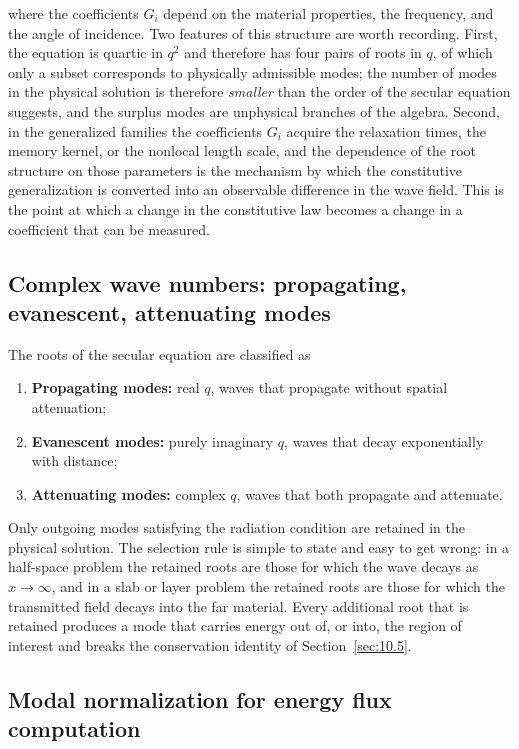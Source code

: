 where the coefficients $G_i$ depend on the material properties, the frequency, and the angle of incidence. Two features of this structure are worth recording. First, the equation is quartic in $q^2$ and therefore has four pairs of roots in $q$, of which only a subset corresponds to physically admissible modes; the number of modes in the physical solution is therefore \emph{smaller} than the order of the secular equation suggests, and the surplus modes are unphysical branches of the algebra. Second, in the generalized families the coefficients $G_i$ acquire the relaxation times, the memory kernel, or the nonlocal length scale, and the dependence of the root structure on those parameters is the mechanism by which the constitutive generalization is converted into an observable difference in the wave field. This is the point at which a change in the constitutive law becomes a change in a coefficient that can be measured.

\subsection{Complex wave numbers: propagating, evanescent, attenuating modes}
\label{sec:8.4}

The roots of the secular equation are classified as

\begin{enumerate}
\item \textbf{Propagating modes:} real $q$, waves that propagate without spatial attenuation;
\item \textbf{Evanescent modes:} purely imaginary $q$, waves that decay exponentially with distance;
\item \textbf{Attenuating modes:} complex $q$, waves that both propagate and attenuate.
\end{enumerate}

Only outgoing modes satisfying the radiation condition are retained in the physical solution. The selection rule is simple to state and easy to get wrong: in a half-space problem the retained roots are those for which the wave decays as $x \to \infty$, and in a slab or layer problem the retained roots are those for which the transmitted field decays into the far material. Every additional root that is retained produces a mode that carries energy out of, or into, the region of interest and breaks the conservation identity of Section~\ref{sec:10.5}.

\subsection{Modal normalization for energy flux computation}
\label{sec:8.5}

